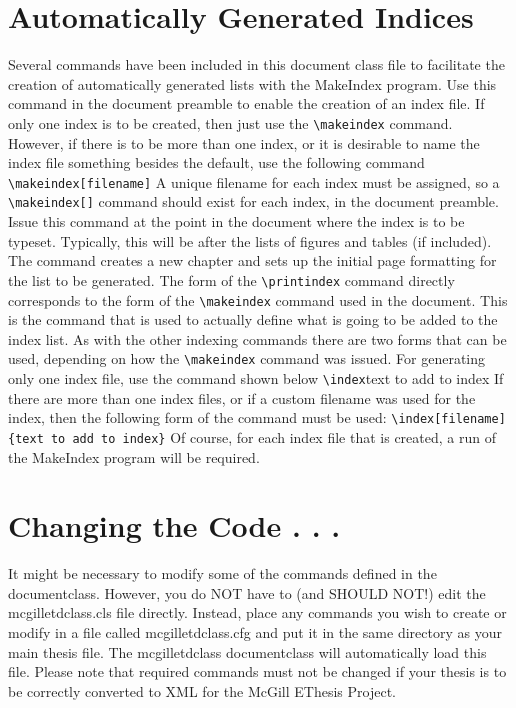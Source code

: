 \documentclass[12pt,Bold,letterpaper,TexShade]{mcgilletdclass}
\begin{document}
\section{Automatically Generated Indices}
Several commands have been included in this document class file to facilitate
the creation of automatically generated lists with the MakeIndex
program. 
Use this command in the document preamble to enable the creation of an 
index file. If only one index is to be created, then just use
the
\verb=\makeindex=
command. However, if there is to be more than one index, or it is
desirable to name the index file something besides the default, use
the following command
\verb=\makeindex[filename]=
A unique filename for each index must be assigned, so a \verb=\makeindex[]=
command should exist for each index, in the document preamble.
Issue this command at the point in the document where the index 
is to be typeset. Typically, this will be after the lists of figures and
tables (if included). The command creates a new chapter and sets up
the initial page formatting for the list to be generated. The form of
the \verb=\printindex= command directly corresponds to the form of the
\verb=\makeindex= command used in the document. 
This is the command that is used to actually define what is going to be 
added to the index list. As with the other indexing commands
there are two forms that can be used, depending on how the
\verb=\makeindex= command was issued. For generating only one index file,
use the command shown below
\verb=\index={text to add to index}
If there are more than one index files, or if a custom filename was used
for the index, then the following form of the command must be used:
\verb=\index[filename]{text to add to index}=
Of course, for each index file that is created, a run of the
MakeIndex program will be required. 
\section{Changing the Code . . .}
It might be necessary to modify some of the commands defined in the
documentclass. However, you do NOT have to (and SHOULD NOT!) edit
the mcgilletdclass.cls file directly. Instead, place any commands
you wish to create or modify in a file called mcgilletdclass.cfg and
put it in the same directory as your main thesis file.  The mcgilletdclass
documentclass will automatically load this file.  Please note that 
required commands must not be changed if your thesis is to be correctly
converted to XML for the McGill EThesis Project.
\end{document}
